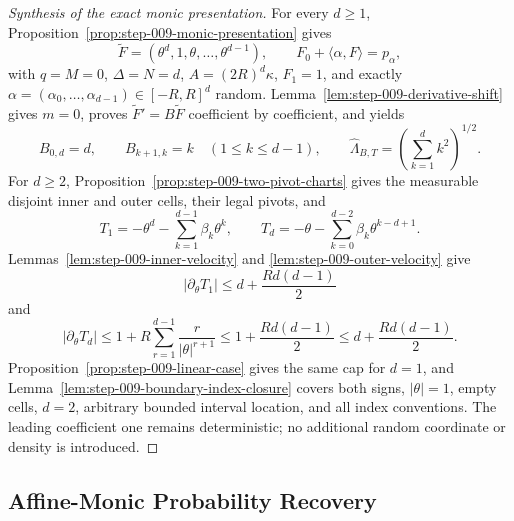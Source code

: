 \begin{proof}[Synthesis of the exact monic presentation]
For every $d\geq1$, Proposition~\ref{prop:step-009-monic-presentation}
gives
\begin{equation}
\label{eq:appendix-display-309}
\widetilde F=(\theta^d,1,\theta,\ldots,\theta^{d-1}),
\qquad
F_0+\langle\alpha,F\rangle=p_\alpha,
\end{equation}
with $q=M=0$, $\Delta=N=d$, $A=(2R)^d\kappa$, $F_1=1$, and
exactly $\alpha=(\alpha_0,\ldots,\alpha_{d-1})\in[-R,R]^d$ random.
Lemma~\ref{lem:step-009-derivative-shift} gives $m=0$, proves
$\widetilde F'=B\widetilde F$ coefficient by coefficient, and yields
\begin{equation}
\label{eq:appendix-display-310}
B_{0,d}=d,
\qquad B_{k+1,k}=k\quad(1\leq k\leq d-1),
\qquad
\widehat\Lambda_{B,T}=\left(\sum_{k=1}^d k^2\right)^{1/2}.
\end{equation}
For $d\geq2$, Proposition~\ref{prop:step-009-two-pivot-charts} gives the
measurable disjoint inner and outer cells, their legal pivots, and
\begin{equation}
\label{eq:appendix-display-311}
T_1=-\theta^d-\sum_{k=1}^{d-1}\beta_k\theta^k,
\qquad
T_d=-\theta-\sum_{k=0}^{d-2}\beta_k\theta^{k-d+1}.
\end{equation}
Lemmas~\ref{lem:step-009-inner-velocity} and
\ref{lem:step-009-outer-velocity} give
\begin{equation}
\label{eq:appendix-display-312}
|\partial_\theta T_1|
\leq d+\frac{Rd(d-1)}2
\end{equation}
and
\begin{equation}
\label{eq:appendix-display-313}
|\partial_\theta T_d|
\leq1+R\sum_{r=1}^{d-1}\frac{r}{|\theta|^{r+1}}
\leq1+\frac{Rd(d-1)}2
\leq d+\frac{Rd(d-1)}2.
\end{equation}
Proposition~\ref{prop:step-009-linear-case} gives the same cap for $d=1$,
and Lemma~\ref{lem:step-009-boundary-index-closure} covers both signs,
$|\theta|=1$, empty cells, $d=2$, arbitrary bounded interval location, and
all index conventions.  The leading coefficient one remains deterministic;
no additional random coordinate or density is introduced.
\end{proof}

\subsection{Affine-Monic Probability Recovery}\label{app:step-010}

